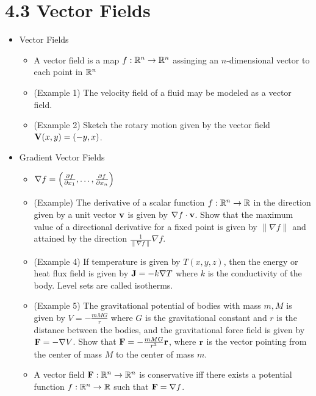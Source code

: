 \documentclass[11pt]{article}
\begin{document}
\section*{4.3 Vector Fields}

\begin{itemize}
  \item Vector Fields
    \begin{itemize}
      \item A vector field is a map \(f:\mathbb R^n\to\mathbb R^n\) assinging an
        \(n\)-dimensional vector to each point in \(\mathbb R^n\)
      \item (Example 1) The velocity field of a fluid may be modeled as a
        vector field.
      \item (Example 2) Sketch the rotary motion given by the vector
        field \(\mathbf{V}(x,y)=\left(-y,x\right)\).
    \end{itemize}
  \item Gradient Vector Fields
    \begin{itemize}
      \item \(\nabla f = \left(\frac{\partial f}{\partial x_1},\dots,\frac{\partial f}{\partial x_n}\right)\)
      \item (Example) The derivative of a scalar function
        \(f:\mathbb R^n\to \mathbb R\) in the direction given by a unit vector
        \(\mathbf{v}\)
        is given by \(\nabla f\cdot \mathbf{v}\). Show that the maximum value
        of a directional derivative for a fixed point
        is given by \(\|\nabla f\|\)
        and attained by the direction \(\frac{1}{\|\nabla f\|}\nabla f\).
      \item (Example 4) If temperature is given by \(T(x,y,z)\), then the
        energy or heat flux field is given by \(\mathbf{J} = -k\nabla T\) where
        \(k\) is the conductivity of the body. Level sets are called isotherms.
      \item (Example 5) The gravitational potential of bodies with mass \(m,M\)
        is given by \(V=-\frac{mMG}{r}\) where \(G\) is the gravitational
        constant and \(r\) is the distance between the bodies, and the
        gravitational force field is given by \(\mathbf{F}=-\nabla V\).
        Show that \(\mathbf{F} = -\frac{mMG}{r^3}\mathbf{r}\), where \(\mathbf{r}\)
        is the vector pointing from the center of mass \(M\) to the center
        of mass \(m\).
      \item A vector field \(\mathbf{F}:\mathbb R^n\to\mathbb R^n\) is conservative iff
        there exists
        a potential function \(f:\mathbb R^n\to\mathbb R\) such that
        \(\mathbf{F}=\nabla f\).

\end{itemize}
\end{itemize}
\end{document}
